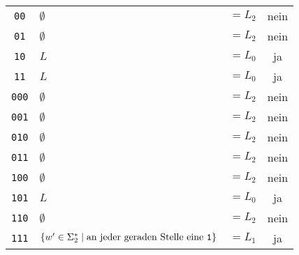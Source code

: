 \begin{loesung}
\begin{teilaufgaben}
\begin{center}
\begin{tabular}{c|ll|c}
 {\tt 00}&$\emptyset$&$=L_2$&nein\\
 {\tt 01}&$\emptyset$&$=L_2$&nein\\
 {\tt 10}&$L$&$=L_0$&ja\\
 {\tt 11}&$L$&$=L_0$&ja\\
{\tt 000}&$\emptyset$&$=L_2$&nein\\
{\tt 001}&$\emptyset$&$=L_2$&nein\\
{\tt 010}&$\emptyset$&$=L_2$&nein\\
{\tt 011}&$\emptyset$&$=L_2$&nein\\
{\tt 100}&$\emptyset$&$=L_2$&nein\\
{\tt 101}&$L$&$=L_0$&ja\\
{\tt 110}&$\emptyset$&$=L_2$&nein\\
{\tt 111}&$\{ w'\in\Sigma_2^*\mid  \text{an jeder geraden Stelle eine {\tt 1}}\}$&$=L_1$&ja\\
\hline
\end{tabular}
\end{center}


\end{teilaufgaben}
\end{loesung}
